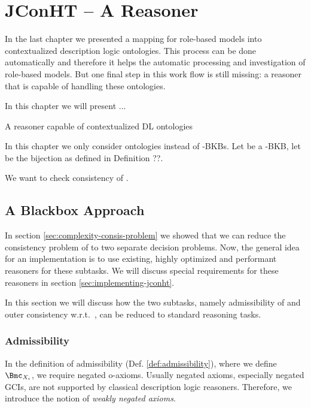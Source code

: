 
\chapter{JConHT -- A \SHOIQSHOIQ Reasoner}
\label{cha:jconht}

In the last chapter we presented a mapping for role-based models into contextualized description
logic ontologies. This process can be done automatically and therefore it helps the automatic
processing and investigation of role-based models. But one final step in this work flow is still
missing: a reasoner that is capable of handling these ontologies.

In this chapter we will present ...


A reasoner capable of contextualized DL ontologies


In this chapter we only consider \LMLO ontologies instead of \LMLO-BKBs. Let \Omc be a
\SHOIQSHOIQ-BKB, let \bsf be the bijection as defined in Definition ??.

We want to check consistency of \Omc. 

\section{A Blackbox Approach}
\label{sec:blackbox-approach}

In section \ref{sec:complexity-consis-problem} we showed that we can reduce the consistency problem
of \LMLO to two separate decision problems. Now, the general idea for an implementation is to use
existing, highly optimized and performant reasoners for these subtasks. We will discuss special
requirements for these reasoners in section \ref{sec:implementing-jconht}. 

In this section we will discuss how the two subtasks, namely admissibility of \Xmc and outer
consistency w.r.t.\ \Xmc, can be reduced to standard reasoning tasks.



\subsection{Admissibility}
\label{sec:admissibility}

In the definition of admissibility (Def. \ref{def:admissibility}), where we define $\Bmc_{X_{i}}$,
we require negated o-axioms. Usually negated axioms, especially negated GCIs, are not supported by
classical description logic reasoners. Therefore, we introduce the notion of \emph{weakly negated
  axioms}.


